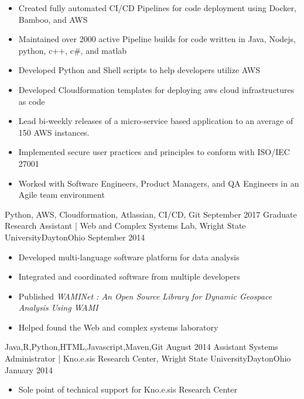 \begin{experiences}
{\begin{itemize}
        \item Created fully automated CI/CD Pipelines for code deployment using Docker, Bamboo, and AWS
        \item Maintained over 2000 active Pipeline builds for code written in Java, Nodejs, python, c++, c\#, and matlab
        \item Developed Python and Shell scripts to help developers utilize AWS
        \item Developed Cloudformation templates for deploying aws cloud infrastructures as code
        \item Lead bi-weekly releases of a micro-service based application to an average of 150 AWS instances.
        \item Implemented secure user practices and principles to conform with ISO/IEC 27001
        \item Worked with Software Engineers, Product Managers, and QA Engineers in an Agile team environment
       \end{itemize}
    }
    {Python, AWS, Cloudformation, Atlassian, CI/CD, Git}
  \emptySeparator
  \experience
    {September 2017}   {Graduate Research Assistant | Web and Complex Systems Lab, Wright State University}{Dayton}{Ohio}
    {September 2014} {
      \begin{itemize}

        \item Developed multi-language software platform for data analysis
        \item Integrated and coordinated software from multiple developers
        \item Published \textit{WAMINet : An Open Source Library for Dynamic Geospace Analysis Using WAMI}
        \item Helped found the Web and complex systems laboratory
      \end{itemize}
    }
    {Java,R,Python,HTML,Javascript,Maven,Git}
  \emptySeparator
  \experience
  {August 2014} {Assistant Systems Administrator | Kno.e.sis Research Center, Wright State University}{Dayton}{Ohio}
  {January 2014}    {
      \begin{itemize}
          \item Sole point of technical support for Kno.e.sis Research Center


\end{itemize}}
\end{experiences}
